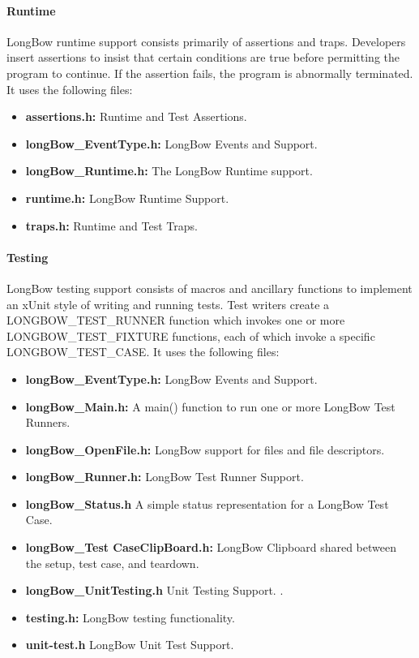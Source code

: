 \documentclass[12pt]{article} %
\begin{document}
\paragraph {Runtime}
LongBow runtime support consists primarily of assertions and traps. Developers insert assertions to insist that certain conditions are true before permitting the program to continue. If the assertion fails, the program is abnormally terminated. It uses the following files:

\begin{itemize}
\item {\bf assertions.h:} 	Runtime and Test Assertions.
 \item {\bf longBow\_EventType.h:} LongBow Events and Support. 
 \item {\bf longBow\_Runtime.h:} The LongBow Runtime support. 
 \item {\bf runtime.h:} LongBow Runtime Support. 
 \item {\bf traps.h:} Runtime and Test Traps. 
\end{itemize}


\paragraph {Testing}
LongBow testing support consists of macros and ancillary functions to implement an xUnit style of writing and running tests. Test writers create a LONGBOW\_TEST\_RUNNER function which invokes one or more LONGBOW\_TEST\_FIXTURE functions, each of which invoke a specific LONGBOW\_TEST\_CASE. It uses the following files:

\begin{itemize}
\item {\bf longBow\_EventType.h:} 	LongBow Events and Support. 
 \item {\bf longBow\_Main.h:} A main() function to run one or more LongBow Test Runners. 
 \item {\bf longBow\_OpenFile.h:} LongBow support for files and file descriptors. 
 \item {\bf longBow\_Runner.h:} LongBow Test Runner Support. 
 \item {\bf longBow\_Status.h} A simple status representation for a LongBow Test Case. 
  \item {\bf longBow\_Test CaseClipBoard.h:} LongBow Clipboard shared between the setup, test case, and teardown. 
 \item {\bf longBow\_UnitTesting.h} Unit Testing Support. . 
 \item {\bf testing.h:} LongBow testing functionality. 
 \item {\bf unit-test.h} LongBow Unit Test Support. 
\end{itemize}
\end{document}
